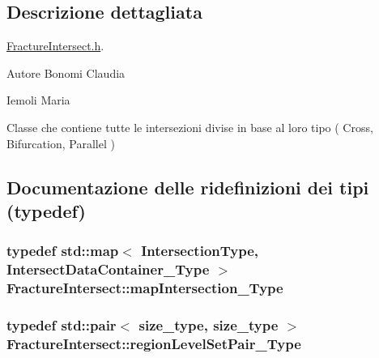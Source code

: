 \subsection{Descrizione dettagliata}
\hyperlink{FractureIntersect_8h}{Fracture\-Intersect.\-h}. 

\begin{DoxyAuthor}{Autore}
Bonomi Claudia

Iemoli Maria
\end{DoxyAuthor}
Classe che contiene tutte le intersezioni divise in base al loro tipo ( Cross, Bifurcation, Parallel ) 

\subsection{Documentazione delle ridefinizioni dei tipi (typedef)}
\hypertarget{classFractureIntersect_a4eea7d0aca48cdd36ea1756e75280332}{
\subsubsection[{map\-Intersection\-\_\-\-Type}]{\setlength{\rightskip}{0pt plus 5cm}typedef std\-::map$<$ {\bf Intersection\-Type}, {\bf Intersect\-Data\-Container\-\_\-\-Type} $>$ {\bf Fracture\-Intersect\-::map\-Intersection\-\_\-\-Type}}}\label{classFractureIntersect_a4eea7d0aca48cdd36ea1756e75280332}
\hypertarget{classFractureIntersect_aea039e89cb4b4314c25c7a362641f40e}{
\subsubsection[{region\-Level\-Set\-Pair\-\_\-\-Type}]{\setlength{\rightskip}{0pt plus 5cm}typedef std\-::pair$<$ size\-\_\-type, size\-\_\-type $>$ {\bf Fracture\-Intersect\-::region\-Level\-Set\-Pair\-\_\-\-Type}}}\label{classFractureIntersect_aea039e89cb4b4314c25c7a362641f40e}


